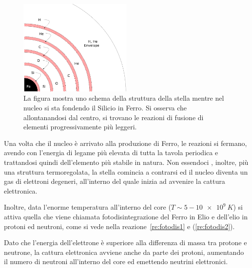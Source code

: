\begin{figure}
    \centering
    \includegraphics[width = 0.5\textwidth]{immagini/onion.png}
    \caption{La figura mostra uno schema della struttura della stella mentre nel nucleo si sta fondendo il Silicio in Ferro. Si osserva che allontanandosi dal centro, si trovano le reazioni di fusione di elementi progressivamente più leggeri.}\label{fig:onion}
\end{figure}

Una volta che il nucleo è arrivato alla produzione di Ferro, le reazioni si fermano, avendo con l'energia di legame più elevata di tutta la tavola periodica e trattandosi quindi dell'elemento più stabile in natura. Non essendoci , inoltre, più una struttura termoregolata, la stella comincia a contrarsi ed il nucleo diventa un gas di elettroni degeneri, all'interno del quale inizia ad avvenire la cattura elettronica. 


Inoltre, data l'enorme temperatura all'interno del core ($T \sim 5-\SI{10e9}{K}$) si attiva quella che viene chiamata fotodisintegrazione del Ferro in Elio e dell'elio in protoni ed neutroni, come si vede nella reazione~\ref{re:fotodis1} e (\ref{re:fotodis2}).


Dato che l'energia dell'elettrone è superiore alla differenza di massa tra protone e neutrone, la cattura elettronica avviene anche da parte dei protoni, aumentando il numero di neutroni all'interno del core ed emettendo neutrini elettronici.


